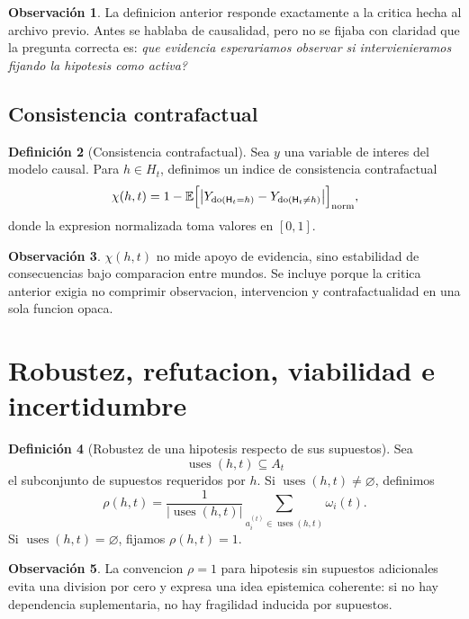 \documentclass[12pt,a4paper]{article}
\newcommand{\E}{\mathbb{E}}
\newcommand{\doop}{\operatorname{do}}
\newcommand{\uses}{\operatorname{uses}}
\theoremstyle{definition}
\newtheorem{definition}{Definici\'on}[section]
\newtheorem{remark}[definition]{Observaci\'on}
\theoremstyle{plain}
\theoremstyle{remark}
\begin{document}
\begin{remark}
La definicion anterior responde exactamente a la critica hecha al archivo previo. Antes se hablaba de causalidad, pero no se fijaba con claridad que la pregunta correcta es: \emph{que evidencia esperariamos observar si intervienieramos fijando la hipotesis como activa?}
\end{remark}

\subsection{Consistencia contrafactual}

\begin{definition}[Consistencia contrafactual]
Sea $y$ una variable de interes del modelo causal. Para $h\in H_t$, definimos un indice de consistencia contrafactual
\begin{equation}
\chi(h,t)=1-\E\Bigl[\bigl|Y_{\doop(\mathsf{H}_t=h)}-Y_{\doop(\mathsf{H}_t\neq h)}\bigr|\Bigr]_{\mathrm{norm}},
\end{equation}
donde la expresion normalizada toma valores en $[0,1]$.
\end{definition}

\begin{remark}
$\chi(h,t)$ no mide apoyo de evidencia, sino estabilidad de consecuencias bajo comparacion entre mundos. Se incluye porque la critica anterior exigia no comprimir observacion, intervencion y contrafactualidad en una sola funcion opaca.
\end{remark}

\section{Robustez, refutacion, viabilidad e incertidumbre}

\begin{definition}[Robustez de una hipotesis respecto de sus supuestos]
Sea
\begin{equation}
\uses(h,t)\subseteq A_t
\end{equation}
el subconjunto de supuestos requeridos por $h$. Si $\uses(h,t)\neq\varnothing$, definimos
\begin{equation}
\rho(h,t)=\frac{1}{|\uses(h,t)|}\sum_{a_i^{(t)}\in \uses(h,t)}\omega_i(t).
\end{equation}
Si $\uses(h,t)=\varnothing$, fijamos $\rho(h,t)=1$.
\end{definition}

\begin{remark}
La convencion $\rho=1$ para hipotesis sin supuestos adicionales evita una division por cero y expresa una idea epistemica coherente: si no hay dependencia suplementaria, no hay fragilidad inducida por supuestos.
\end{remark}
\end{document}

